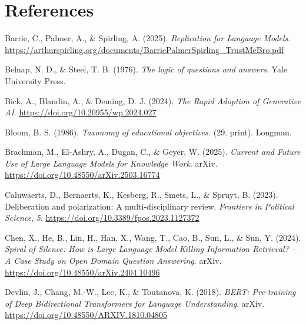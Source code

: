 \documentclass[
  12pt,
]{article}
\newlength{\cslhangindent}
\newenvironment{CSLReferences}[2] %
 {\begin{list}{}{%
  \setlength{\itemindent}{0pt}
  \setlength{\leftmargin}{0pt}
  \setlength{\parsep}{0pt}
  \ifodd #1
   \setlength{\leftmargin}{\cslhangindent}
   \setlength{\itemindent}{-1\cslhangindent}
  \fi
  \setlength{\itemsep}{#2\baselineskip}}}
 {\end{list}}
\begin{document}
\clearpage

\section*{References}\label{references}

\label{refs}
\begin{CSLReferences}{1}{0}
Barrie, C., Palmer, A., \& Spirling, A. (2025). \emph{Replication for {Language} {Models}}. \url{https://arthurspirling.org/documents/BarriePalmerSpirling_TrustMeBro.pdf}

Belnap, N. D., \& Steel, T. B. (1976). \emph{The logic of questions and answers}. Yale University Press.

Bick, A., Blandin, A., \& Deming, D. J. (2024). \emph{The {Rapid} {Adoption} of {Generative} {AI}}. \url{https://doi.org/10.20955/wp.2024.027}

Bloom, B. S. (1986). \emph{Taxonomy of educational objectives.} (29. print). Longman.

Brachman, M., El-Ashry, A., Dugan, C., \& Geyer, W. (2025). \emph{Current and {Future} {Use} of {Large} {Language} {Models} for {Knowledge} {Work}}. arXiv. \url{https://doi.org/10.48550/arXiv.2503.16774}

Caluwaerts, D., Bernaerts, K., Kesberg, R., Smets, L., \& Spruyt, B. (2023). Deliberation and polarization: A multi-disciplinary review. \emph{Frontiers in Political Science}, \emph{5}. \url{https://doi.org/10.3389/fpos.2023.1127372}

Chen, X., He, B., Lin, H., Han, X., Wang, T., Cao, B., Sun, L., \& Sun, Y. (2024). \emph{Spiral of {Silence}: {How} is {Large} {Language} {Model} {Killing} {Information} {Retrieval}? -- {A} {Case} {Study} on {Open} {Domain} {Question} {Answering}}. arXiv. \url{https://doi.org/10.48550/arXiv.2404.10496}

Devlin, J., Chang, M.-W., Lee, K., \& Toutanova, K. (2018). \emph{{BERT}: {Pre}-training of {Deep} {Bidirectional} {Transformers} for {Language} {Understanding}}. arXiv. \url{https://doi.org/10.48550/ARXIV.1810.04805}


\end{CSLReferences}
\end{document}
